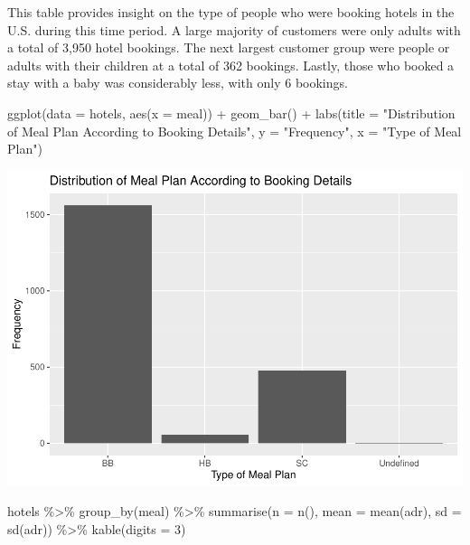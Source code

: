 \documentclass[
]{article}
\newenvironment{Shaded}{\begin{snugshade}}{\end{snugshade}}
\newcommand{\AttributeTok}[1]{\textcolor[rgb]{0.77,0.63,0.00}{#1}}
\newcommand{\DecValTok}[1]{\textcolor[rgb]{0.00,0.00,0.81}{#1}}
\newcommand{\FunctionTok}[1]{\textcolor[rgb]{0.00,0.00,0.00}{#1}}
\newcommand{\NormalTok}[1]{#1}
\newcommand{\SpecialCharTok}[1]{\textcolor[rgb]{0.00,0.00,0.00}{#1}}
\newcommand{\StringTok}[1]{\textcolor[rgb]{0.31,0.60,0.02}{#1}}
\begin{document}
This table provides insight on the type of people who were booking
hotels in the U.S. during this time period. A large majority of
customers were only adults with a total of 3,950 hotel bookings. The
next largest customer group were people or adults with their children at
a total of 362 bookings. Lastly, those who booked a stay with a baby was
considerably less, with only 6 bookings.

\begin{Shaded}
\begin{Highlighting}[]
\FunctionTok{ggplot}\NormalTok{(}\AttributeTok{data =}\NormalTok{ hotels, }\FunctionTok{aes}\NormalTok{(}\AttributeTok{x =}\NormalTok{ meal)) }\SpecialCharTok{+}
\FunctionTok{geom\_bar}\NormalTok{() }\SpecialCharTok{+}
\FunctionTok{labs}\NormalTok{(}\AttributeTok{title =} \StringTok{"Distribution of Meal Plan According to Booking Details"}\NormalTok{,}
      \AttributeTok{y =} \StringTok{"Frequency"}\NormalTok{,}
      \AttributeTok{x =} \StringTok{"Type of Meal Plan"}\NormalTok{) }
\end{Highlighting}
\end{Shaded}

\includegraphics{written_report_files/figure-latex/unnamed-chunk-2-1.pdf}

\begin{Shaded}
\begin{Highlighting}[]
\NormalTok{hotels }\SpecialCharTok{\%\textgreater{}\%}
  \FunctionTok{group\_by}\NormalTok{(meal) }\SpecialCharTok{\%\textgreater{}\%}
  \FunctionTok{summarise}\NormalTok{(}\AttributeTok{n =} \FunctionTok{n}\NormalTok{(), }\AttributeTok{mean =} \FunctionTok{mean}\NormalTok{(adr), }\AttributeTok{sd =} \FunctionTok{sd}\NormalTok{(adr)) }\SpecialCharTok{\%\textgreater{}\%}
  \FunctionTok{kable}\NormalTok{(}\AttributeTok{digits =} \DecValTok{3}\NormalTok{)}
\end{Highlighting}
\end{Shaded}
\end{document}
